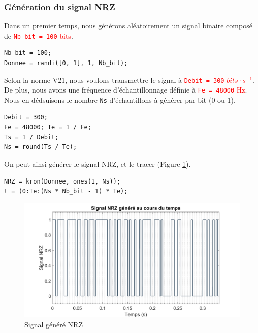 \subsubsection{Génération du signal NRZ}
Dans un premier temps, nous générons aléatoirement un signal binaire composé de \textcolor{Red}{\lstinline{Nb_bit = 100} bits}.

\begin{lstlisting}[caption=Génération aléatoire d'un signal binaire]
Nb_bit = 100;
Donnee = randi([0, 1], 1, Nb_bit);
\end{lstlisting}

Selon la norme V21, nous voulons transmettre le signal à \textcolor{Red}{\lstinline{Debit = 300} $bits\cdot s^{-1}$}.
   De plus, nous avons une fréquence d'échantillonnage définie à \textcolor{Red}{\lstinline{Fe = 48000} Hz}.
   Nous en dédsuisons le nombre \lstinline{Ns} d'échantillons à générer par bit (0 ou 1).


   \begin{lstlisting}[caption=Détermination du nombre $N_s$ d'échantillons]
Debit = 300;
Fe = 48000; Te = 1 / Fe;
Ts = 1 / Debit;
Ns = round(Ts / Te);
\end{lstlisting}

   On peut ainsi générer le signal NRZ, et le tracer (Figure \ref{fig : nrz}).

   \begin{lstlisting}[caption=Génération du signal NRZ]
NRZ = kron(Donnee, ones(1, Ns));
t = (0:Te:(Ns * Nb_bit - 1) * Te);
\end{lstlisting}


   \begin{figure}[ht!]
      \centering
      \includegraphics[scale=0.4]{partie-2/sous-partie-1/2.1.1.1.png}
      \caption{Signal généré NRZ \label{fig : nrz}}
   \end{figure}

